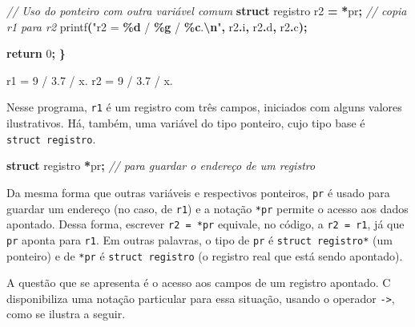 \documentclass[
  11pt,
  a4paper,
]{scrbook}
\newenvironment{Shaded}{\begin{snugshade}}{\end{snugshade}}
\newcommand{\CommentTok}[1]{\textcolor[rgb]{0.56,0.35,0.01}{\textit{#1}}}
\newcommand{\ControlFlowTok}[1]{\textcolor[rgb]{0.13,0.29,0.53}{\textbf{#1}}}
\newcommand{\DecValTok}[1]{\textcolor[rgb]{0.00,0.00,0.81}{#1}}
\newcommand{\KeywordTok}[1]{\textcolor[rgb]{0.13,0.29,0.53}{\textbf{#1}}}
\newcommand{\NormalTok}[1]{#1}
\newcommand{\OperatorTok}[1]{\textcolor[rgb]{0.81,0.36,0.00}{\textbf{#1}}}
\newcommand{\SpecialCharTok}[1]{\textcolor[rgb]{0.81,0.36,0.00}{\textbf{#1}}}
\newcommand{\StringTok}[1]{\textcolor[rgb]{0.31,0.60,0.02}{#1}}
\begin{document}
\begin{Shaded}
\begin{Highlighting}[]
    \CommentTok{// Uso do ponteiro com outra variável comum}
    \KeywordTok{struct}\NormalTok{ registro r2 }\OperatorTok{=} \OperatorTok{*}\NormalTok{pr}\OperatorTok{;}  \CommentTok{// copia r1 para r2}
\NormalTok{    printf}\OperatorTok{(}\StringTok{"r2 = }\SpecialCharTok{\%d}\StringTok{ / }\SpecialCharTok{\%g}\StringTok{ / \textquotesingle{}}\SpecialCharTok{\%c}\StringTok{\textquotesingle{}.}\SpecialCharTok{\textbackslash{}n}\StringTok{"}\OperatorTok{,}\NormalTok{ r2}\OperatorTok{.}\NormalTok{i}\OperatorTok{,}\NormalTok{ r2}\OperatorTok{.}\NormalTok{d}\OperatorTok{,}\NormalTok{ r2}\OperatorTok{.}\NormalTok{c}\OperatorTok{);}

    \ControlFlowTok{return} \DecValTok{0}\OperatorTok{;}
\OperatorTok{\}}
\end{Highlighting}
\end{Shaded}

\begin{Shaded}
\begin{Highlighting}[]
\NormalTok{r1 = 9 / 3.7 / \textquotesingle{}x\textquotesingle{}.}
\NormalTok{r2 = 9 / 3.7 / \textquotesingle{}x\textquotesingle{}.}
\end{Highlighting}
\end{Shaded}

Nesse programa, \texttt{r1} é um registro com três campos, iniciados com
alguns valores ilustrativos. Há, também, uma variável do tipo ponteiro,
cujo tipo base é \texttt{struct\ registro}.

\begin{Shaded}
\begin{Highlighting}[]
\KeywordTok{struct}\NormalTok{ registro }\OperatorTok{*}\NormalTok{pr}\OperatorTok{;}  \CommentTok{// para guardar o endereço de um registro}
\end{Highlighting}
\end{Shaded}

Da mesma forma que outras variáveis e respectivos ponteiros, \texttt{pr}
é usado para guardar um endereço (no caso, de \texttt{r1}) e a notação
\texttt{*pr} permite o acesso aos dados apontado. Dessa forma, escrever
\texttt{r2\ =\ *pr} equivale, no código, a \texttt{r2\ =\ r1}, já que
\texttt{pr} aponta para \texttt{r1}. Em outras palavras, o tipo de
\texttt{pr} é \texttt{struct\ registro*} (um ponteiro) e de \texttt{*pr}
é \texttt{struct\ registro} (o registro real que está sendo apontado).

A questão que se apresenta é o acesso aos campos de um registro
apontado. C disponibiliza uma notação particular para essa situação,
usando o operador \texttt{-\textgreater{}}, como se ilustra a seguir.
\end{document}
